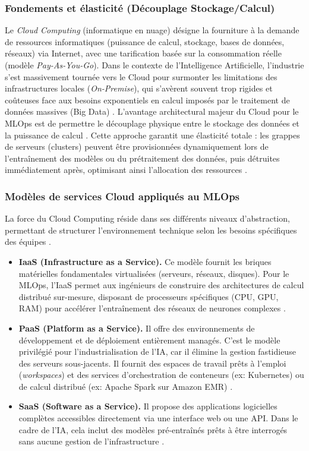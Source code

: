 \subsubsection{Fondements et élasticité (Découplage Stockage/Calcul)}
Le \textit{Cloud Computing} (informatique en nuage) désigne la fourniture à la demande de ressources informatiques (puissance de calcul, stockage, bases de données, réseaux) via Internet, avec une tarification basée sur la consommation réelle (modèle \textit{Pay-As-You-Go}). Dans le contexte de l'Intelligence Artificielle, l'industrie s'est massivement tournée vers le Cloud pour surmonter les limitations des infrastructures locales (\textit{On-Premise}), qui s'avèrent souvent trop rigides et coûteuses face aux besoins exponentiels en calcul imposés par le traitement de données massives (Big Data) \cite{60}. L'avantage architectural majeur du Cloud pour le MLOps est de permettre le découplage physique entre le stockage des données et la puissance de calcul \cite{76}. Cette approche garantit une élasticité totale : les grappes de serveurs (clusters) peuvent être provisionnées dynamiquement lors de l'entraînement des modèles ou du prétraitement des données, puis détruites immédiatement après, optimisant ainsi l'allocation des ressources \cite{43}.

\subsubsection{Modèles de services Cloud appliqués au MLOps}
La force du Cloud Computing réside dans ses différents niveaux d'abstraction, permettant de structurer l'environnement technique selon les besoins spécifiques des équipes \cite{60}.
\begin{itemize}
    \item[$\bullet$] \textbf{IaaS (Infrastructure as a Service).} Ce modèle fournit les briques matérielles fondamentales virtualisées (serveurs, réseaux, disques). Pour le MLOps, l'IaaS permet aux ingénieurs de construire des architectures de calcul distribué sur-mesure, disposant de processeurs spécifiques (CPU, GPU, RAM) pour accélérer l'entraînement des réseaux de neurones complexes \cite{60, 87}.
    \item[$\bullet$] \textbf{PaaS (Platform as a Service).} Il offre des environnements de développement et de déploiement entièrement managés. C'est le modèle privilégié pour l'industrialisation de l'IA, car il élimine la gestion fastidieuse des serveurs sous-jacents. Il fournit des espaces de travail prêts à l'emploi (\textit{workspaces}) et des services d'orchestration de conteneurs (ex: Kubernetes) ou de calcul distribué (ex: Apache Spark sur Amazon EMR) \cite{35, 60}.
    \item[$\bullet$] \textbf{SaaS (Software as a Service).} Il propose des applications logicielles complètes accessibles directement via une interface web ou une API. Dans le cadre de l'IA, cela inclut des modèles pré-entraînés prêts à être interrogés sans aucune gestion de l'infrastructure \cite{60}.
\end{itemize}

